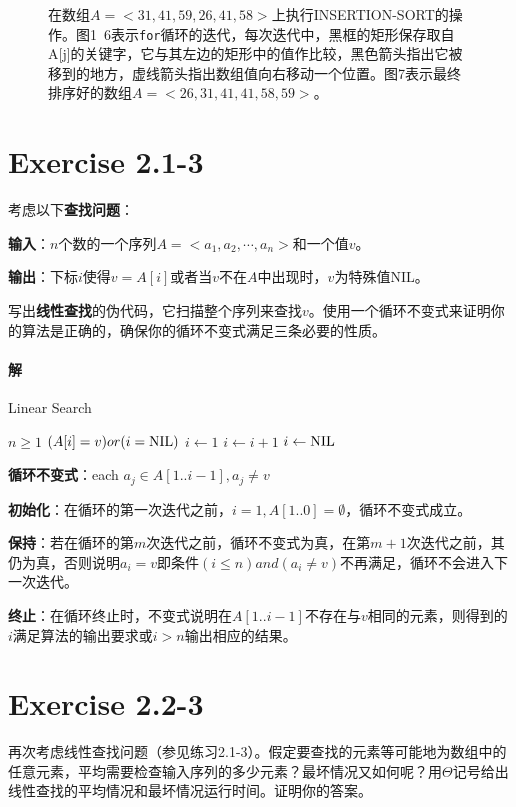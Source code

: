\documentclass{article}
\begin{document}
\begin{figure}
\caption{在数组$A=<31,41,59,26,41,58>$上执行\textsc{INSERTION-SORT}的操作。图1~6表示\texttt{for}循环的迭代，每次迭代中，黑框的矩形保存取自A[j]的关键字，它与其左边的矩形中的值作比较，黑色箭头指出它被移到的地方，虚线箭头指出数组值向右移动一个位置。图7表示最终排序好的数组$A=<26,31,41,41,58,59>$。}
\label{fig:label}
\end{figure}

\section{Exercise 2.1-3}
考虑以下\textbf{查找问题}：\par
\textbf{输入}：$n$个数的一个序列$A=<a_1,a_2,\cdots,a_n>$和一个值$v$。\par
\textbf{输出}：下标$i$使得$v=A[i]$或者当$v$不在$A$中出现时，$v$为特殊值$\mathrm{NIL}$。\par
写出\textbf{线性查找}的伪代码，它扫描整个序列来查找$v$。使用一个循环不变式来证明你的算法是正确的，确保你的循环不变式满足三条必要的性质。\\
\par
\paragraph{解}
\FloatBarrier
\begin{algorithm}[h]
\caption{Linear Search}
\label{alg1}
\begin{algorithmic}
\REQUIRE $n \geq 1$
\ENSURE $(A[i] = v)or(i = \textnormal{NIL})$
\STATE $i \gets 1$
$i \gets i + 1$
\ENDWHILE
{}
\STATE $i \gets \textnormal{NIL}$
\ENDIF
\end{algorithmic}
\end{algorithm}

\par
\textbf{循环不变式}：each $a_j \in A[1..i-1], a_j \neq v$ \par
\textbf{初始化}：在循环的第一次迭代之前，$i = 1, A[1..0] = \emptyset$，循环不变式成立。\par
\textbf{保持}：若在循环的第$m$次迭代之前，循环不变式为真，在第$m+1$次迭代之前，其仍为真，否则说明$a_i = v$即条件$(i \leq n ) and ( a_i \neq v)$不再满足，循环不会进入下一次迭代。 \par
\textbf{终止}：在循环终止时，不变式说明在$A[1..i-1]$不存在与$v$相同的元素，则得到的$i$满足算法的输出要求或$i > n$输出相应的结果。

\section{Exercise 2.2-3}
再次考虑线性查找问题（参见练习2.1-3）。假定要查找的元素等可能地为数组中的任意元素，平均需要检查输入序列的多少元素？最坏情况又如何呢？用$\Theta$记号给出线性查找的平均情况和最坏情况运行时间。证明你的答案。\\
\par
\end{document}
